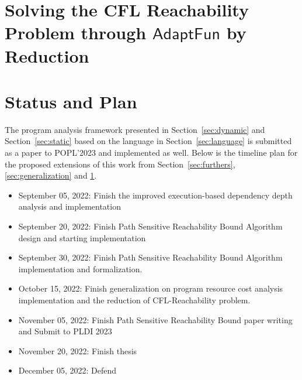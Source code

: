 \documentclass[a4paper,11pt]{article}
\newcommand{\THESYSTEM}{\textsf{AdaptFun}}
\begin{document}
\section{Solving the CFL Reachability Problem through $\THESYSTEM$ by Reduction}
\label{sec:cfl_reduction}


\section{Status and Plan}
The program analysis framework presented in Section~\ref{sec:dynamic} and Section~\ref{sec:static} 
based on the language in Section~\ref{sec:language}
 is submitted as a paper to POPL'2023 and implemented as well. 
 Below is the timeline plan for the proposed extensions of this work
 from Section~\ref{sec:furthers}, \ref{sec:generalization} and \ref{sec:cfl_reduction}.
\begin{itemize}
\item September 05, 2022: Finish the improved execution-based dependency depth analysis and implementation
\item September 20, 2022: Finish Path Sensitive Reachability Bound Algorithm design and starting implementation
\item September 30, 2022: Finish Path Sensitive Reachability Bound Algorithm implementation and formalization.
\item October 15, 2022:  Finish generalization on program resource cost analysis implementation 
and the reduction of CFL-Reachability problem.
\item November 05, 2022: Finish Path Sensitive Reachability Bound paper writing and Submit to PLDI 2023
\item November 20, 2022: Finish thesis
\item December 05, 2022: Defend
\end{itemize}




\end{document}
